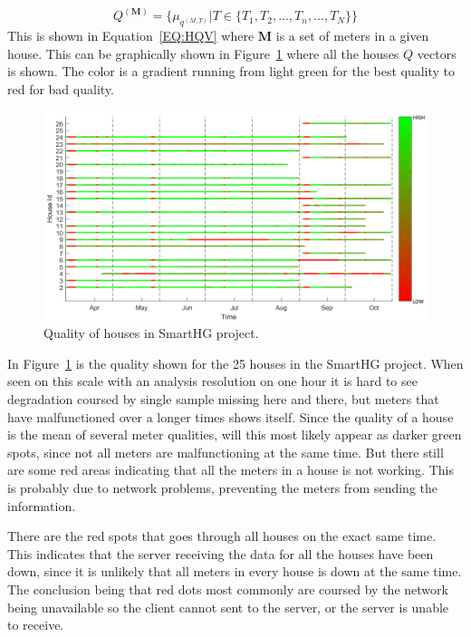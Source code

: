 \begin{equation}
	Q^{(\mathbf{M})} = \{ \mu_{q^{(M,T)}} | T \in \{T_1, T_2, ... ,T_n,..., T_N  \} \}
	\label{EQ:HQV}
\end{equation}
This is shown in Equation~\ref{EQ:HQV} where $\mathbf{M}$ is a set of meters in a given house. This can be graphically shown in Figure~\ref{fig:SmartHGQuality} where all the houses $Q$ vectors is shown. The color is a gradient running from light green for the best quality to red for bad quality.
\begin{figure}[H]
\centering
\includegraphics[width=1\textwidth]{billeder/QualityBig.png}
\caption{Quality of houses in SmartHG project.}
\label{fig:SmartHGQuality}
\end{figure} 

In Figure~\ref{fig:SmartHGQuality} is the  quality shown for the 25 houses in the SmartHG project. When seen on this scale with an analysis resolution on one hour it is hard to see degradation coursed by single sample missing here and there, but meters that have malfunctioned over a longer times shows itself. Since the quality of a house is the mean of several meter qualities, will this most likely appear as darker green spots, since not all meters are malfunctioning at the same time. But there still are some red areas indicating that all the meters in a house is not working. This is probably due to network problems, preventing the meters from sending the information.

There are the red spots that goes through all houses on the exact same time. This indicates that the server receiving the data for all the houses have been down, since it is unlikely that all meters in every house is down at the same time. The conclusion being that red dots most commonly are coursed by the network being unavailable so the client cannot sent to the server, or the server is unable to receive. 

